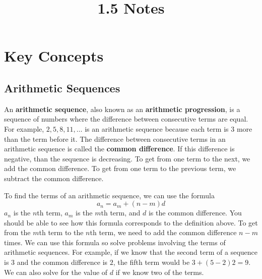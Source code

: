 \documentclass[twocolumn]{article}
\title{1.5 Notes}
\author{}
\date{}
\begin{document}
    \maketitle

    \section*{Key Concepts}
    \subsection*{Arithmetic Sequences}
    An \textbf{arithmetic sequence}, also known as an \textbf{arithmetic
    progression}, is a sequence of numbers where the difference between
    consecutive terms are equal. For example, $2, 5, 8, 11, \dots$ is an
    arithmetic sequence because each term is $3$ more than the term before
    it. The difference between consecutive terms in an arithmetic sequence
    is called the \textbf{common difference}. If this difference is
    negative, than the sequence is decreasing. To get from one term to the
    next, we add the common difference. To get from one term to the previous
    term, we subtract the common difference.

    To find the terms of an arithmetic sequence, we can use the formula
    \[a_n = a_m + (n - m)d\] $a_n$ is the $n$th term, $a_m$ is the $m$th
    term, and $d$ is the common difference. You should be able to see how
    this formula corresponds to the definition above. To get from the $m$th
    term to the $n$th term, we need to add the common difference $n - m$
    times. We can use this formula so solve problems involving the terms of
    arithmetic sequences. For example, if we know that the second term of a
    sequence is $3$ and the common difference is $2$, the fifth term would
    be $3 + (5 - 2)2 = 9$. We can also solve for the value of $d$ if we know
    two of the terms.
\end{document}

